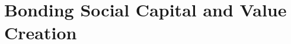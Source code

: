 \documentclass[notes, aspectratio=1610]{beamer}
\begin{document}
\section{Bonding Social Capital and Value Creation}



\end{document}
